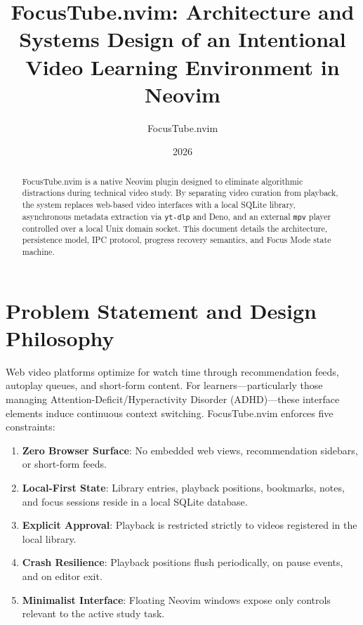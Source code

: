\documentclass[11pt,a4paper]{article}
\title{FocusTube.nvim: Architecture and Systems Design of an Intentional Video Learning Environment in Neovim}
\author{FocusTube.nvim}
\date{2026}
\begin{document}
\maketitle

\begin{abstract}
FocusTube.nvim is a native Neovim plugin designed to eliminate algorithmic distractions during technical video study. By separating video curation from playback, the system replaces web-based video interfaces with a local SQLite library, asynchronous metadata extraction via \texttt{yt-dlp} and Deno, and an external \texttt{mpv} player controlled over a local Unix domain socket. This document details the architecture, persistence model, IPC protocol, progress recovery semantics, and Focus Mode state machine.
\end{abstract}

\section{Problem Statement and Design Philosophy}
Web video platforms optimize for watch time through recommendation feeds, autoplay queues, and short-form content. For learners---particularly those managing Attention-Deficit/Hyperactivity Disorder (ADHD)---these interface elements induce continuous context switching. FocusTube.nvim enforces five constraints:
\begin{enumerate}
  \item \textbf{Zero Browser Surface}: No embedded web views, recommendation sidebars, or short-form feeds.
  \item \textbf{Local-First State}: Library entries, playback positions, bookmarks, notes, and focus sessions reside in a local SQLite database.
  \item \textbf{Explicit Approval}: Playback is restricted strictly to videos registered in the local library.
  \item \textbf{Crash Resilience}: Playback positions flush periodically, on pause events, and on editor exit.
  \item \textbf{Minimalist Interface}: Floating Neovim windows expose only controls relevant to the active study task.
\end{enumerate}
\end{document}
